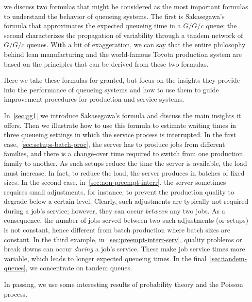  we discuss two formulas that might be considered as the most important formulas to understand the behavior of queueing systems.
The first is Sakasegawa's formula that approximates the expected queueing time in a $G/G/c$ queue; the second characterizes the propagation of variability through a tandem network of $G/G/c$ queues.
With a bit of exaggeration, we can  say that the entire philosophy behind lean manufacturing and the world-famous Toyota production system are based on the principles that can be derived from these two formulas.

Here we take these formulas for granted, but focus on the insights they provide into the performance of queueing systems and how to use them to guide improvement procedures for production and service systems.


In~\cref{sec:gg1} we introduce Sakasegawa's formula and discuss the main insights it offers.
Then we illustrate how to use this formula to estimate waiting times in three queueing settings in which the service process is interrupted.
In the first case,~\cref{sec:setups-batch-proc}, the server has to produce jobs from different families, and there is a change-over time required to switch from one production family to another.
As such setups reduce the time the server is available, the load must increase.
In fact, to reduce the load, the server produces in batches of fixed sizes.
In the second case, in~\cref{sec:non-preempt-interr}, the server sometimes requires small adjustments, for instance, to prevent the production quality to degrade below a certain level.
Clearly, such adjustments are typically not required during a job's service; however, they can occur \emph{between} any two jobs.
As a consequence, the number of jobs served between two such adjustments (or setups) is not constant, hence different from batch production where  batch sizes are constant.
In the third example, in~\cref{sec:preempt-interr-serv}, quality problems or break downs can occur \emph{during} a job's service.
These make job service times more variable, which leads to longer expected queueing times.
In the final~\cref{sec:tandem-queues}, we concentrate on tandem queues.

In passing, we use some interesting results of probability theory and the Poisson process.








